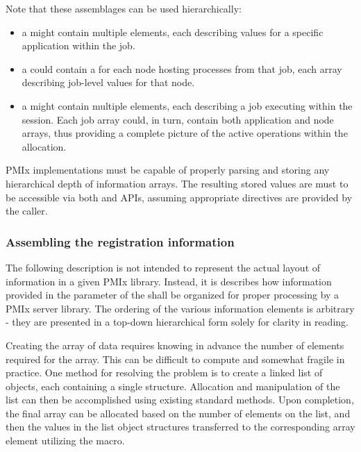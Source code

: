 Note that these assemblages can be used hierarchically:

\begin{itemize}
\item a  might contain multiple  elements, each describing values for a specific application within the job.
\item a  could contain a  for each node hosting processes from that job, each array describing job-level values for that node.
\item a  might contain multiple  elements, each describing a job executing within the session. Each job array could, in turn, contain both application and node arrays, thus providing a complete picture of the active operations within the allocation.
\end{itemize}

\adviceimplstart
\ac{PMIx} implementations must be capable of properly parsing and storing any hierarchical depth of information arrays. The resulting stored values are must to be accessible via both  and  \acp{API}, assuming appropriate directives are provided by the caller.
\adviceimplend

\subsubsection{Assembling the registration information}
\label{chap:api_server:assemble}

The following description is not intended to represent the actual layout of information in a given \ac{PMIx} library. Instead, it is describes how information provided in the  parameter of the  shall be organized for proper processing by a \ac{PMIx} server library. The ordering of the various information elements is arbitrary - they are presented in a top-down hierarchical form solely for clarity in reading.

\advicermstart
Creating the  array of data requires knowing in advance the number of elements required for the array. This can be difficult to compute and somewhat fragile in practice. One method for resolving the problem is to create a linked list of objects, each containing a single  structure. Allocation and manipulation of the list can then be accomplished using existing standard methods. Upon completion, the final  array can be allocated based on the number of elements on the list, and then the values in the list object  structures transferred to the corresponding array element utilizing the  macro.
\advicermend

